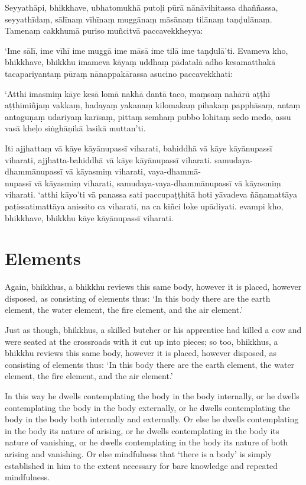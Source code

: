 \paliPage

Seyyathāpi, bhikkhave, ubhatomukhā putoḷi pūrā nānāvihitassa dhaññassa,
seyyathīdaṃ, sālīnaṃ vīhīnaṃ muggānaṃ māsānaṃ tilānaṃ taṇḍulānaṃ. Tamenaṃ
cakkhumā puriso muñcitvā paccavekkheyya:

‘Ime sālī, ime vīhī ime muggā ime māsā ime tilā ime taṇḍulā’ti. Evameva kho,
bhikkhave, bhikkhu imameva kāyaṃ uddhaṃ pādatalā adho kesamatthakā
tacapariyantaṃ pūraṃ nānappakārassa asucino paccavekkhati:

‘Atthi imasmiṃ kāye kesā lomā nakhā dantā taco, maṃsaṃ nahārū aṭṭhī aṭṭhimiñjaṃ
vakkaṃ, hadayaṃ yakanaṃ kilomakaṃ pihakaṃ papphāsaṃ, antaṃ antaguṇaṃ udariyaṃ
karīsaṃ, pittaṃ semhaṃ pubbo lohitaṃ sedo medo, assu vasā kheḷo siṅghāṇikā
lasikā muttan’ti.

Iti ajjhattaṃ vā kāye kāyānupassī viharati, bahiddhā vā kāye kāyānupassī
viharati, ajjhatta-bahiddhā vā kāye kāyānupassī viharati. samudaya-dhammānupassī
vā kāyasmiṃ viharati, vaya-dhammā-\\
nupassī vā kāyasmiṃ viharati, samudaya-vaya-dhammānupassī vā kāyasmiṃ viharati.
‘atthi kāyo’ti vā panassa sati paccupaṭṭhitā hoti yāvadeva ñāṇamattāya
paṭissatimattāya anissito ca viharati, na ca kiñci loke upādiyati. evampi kho,
bhikkhave, bhikkhu kāye kāyānupassī viharati.


\englishPage
\section{Elements}

Again, bhikkhus, a bhikkhu reviews this same body, however it is placed, however
disposed, as consisting of elements thus: `In this body there are the earth
element, the water element, the fire element, and the air element.'

Just as though, bhikkhus, a skilled butcher or his apprentice had killed a cow
and were seated at the crossroads with it cut up into pieces; so too, bhikkhus,
a bhikkhu reviews this same body, however it is placed, however disposed, as
consisting of elements thus: `In this body there are the earth element, the
water element, the fire element, and the air element.'

In this way he dwells contemplating the body in the body internally, or he
dwells contemplating the body in the body externally, or he dwells contemplating
the body in the body both internally and externally. Or else he dwells
contemplating in the body its nature of arising, or he dwells contemplating in
the body its nature of vanishing, or he dwells contemplating in the body its
nature of both arising and vanishing. Or else mindfulness that ‘there is a body’
is simply established in him to the extent necessary for bare knowledge and
repeated mindfulness.


